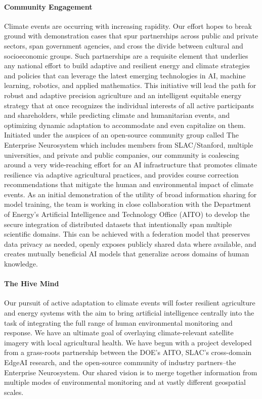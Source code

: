 
\paragraph{Community Engagement}
Climate events are occurring with increasing rapidity. 
Our effort hopes to break ground with demonstration cases that spur partnerships across public and private sectors, span government agencies, and cross the divide between cultural and socioeconomic groups.
Such partnerships are a requisite element \cite{SDGs} that underlies any national effort to build adaptive and resilient energy and climate strategies and policies that can leverage the latest emerging technologies in AI, machine learning, robotics, and applied mathematics. 
This initiative will lead the path for robust and adaptive precision agriculture and an intelligent equitable energy strategy that at once recognizes the individual interests of all active participants and shareholders, while predicting climate and humanitarian events, and optimizing dynamic adaptation to accommodate and even capitalize on them.
Initiated under the auspices of an open-source community group called The Enterprise Neurosystem which includes members from SLAC/Stanford, multiple universities, and private and public companies, our community is coalescing around a very wide-reaching effort for an AI infrastructure that promotes climate resilience via adaptive agricultural practices, and provides course correction recommendations that mitigate the human and environmental impact of climate events.
As an initial demonstration of the utility of broad information sharing for model training, the team is working in close collaboration with the Department of Energy's Artificial Intelligence and Technology Office (AITO) to develop the secure integration of distributed datasets that intentionally span multiple scientific domains. 
This can be achieved with a federation model that preserves data privacy as needed, openly exposes publicly shared data where available, and creates mutually beneficial AI models that generalize across domains of human knowledge.

\paragraph{The Hive Mind}
Our pursuit of active adaptation to climate events will foster resilient agriculture and energy systems with the aim to bring artificial intelligence centrally into the task of integrating the full range of human environmental monitoring and response. 
We have an ultimate goal of overlaying climate-relevant satellite imagery with local agricultural health.
We have begun with a project developed from a grass-roots partnership between the DOE's AITO, SLAC's cross-domain EdgeAI research, and the open-source community of industry partners--the Enterprise Neurosystem.
Our shared vision is to merge together information from multiple modes of environmental monitoring and at vastly different geospatial scales.

